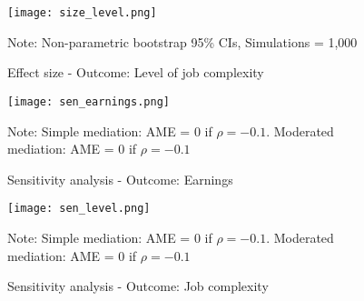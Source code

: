 \documentclass[12pt,a4paper]{article}
\begin{document}
\begin{figure}
\centering
\texttt{[image: size\_level.png]}
  \caption{Effect size - Outcome: Level of job complexity}
\small{Note: Non-parametric bootstrap 95\% CIs, Simulations = 1,000}
\end{figure}

\begin{figure}
\centering
\texttt{[image: sen\_earnings.png]}
  \caption{Sensitivity analysis - Outcome: Earnings}
\small{Note: Simple mediation: AME = 0 if $\rho = -0.1$. Moderated mediation: AME = 0 if $\rho = -0.1$}
\end{figure}

\begin{figure}
\centering
\texttt{[image: sen\_level.png]}
  \caption{Sensitivity analysis - Outcome: Job complexity}
\small{Note: Simple mediation: AME = 0 if $\rho = -0.1$. Moderated mediation: AME = 0 if $\rho = -0.1 $}
\end{figure}
\end{document}
